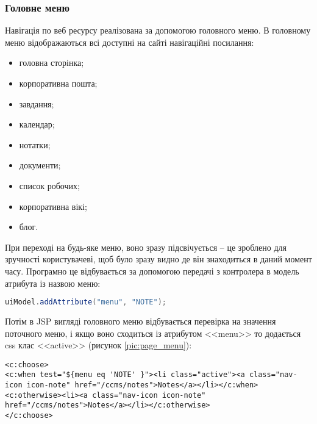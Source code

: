 \subsubsection{Головне меню}
\par Навігація по веб ресурсу реалізована за допомогою головного меню. В головному меню відображаються всі доступні на сайті навігаційні посилання:
\begin{itemize}
  \item головна сторінка;
  \item корпоративна пошта;
  \item завдання;
  \item календар;
  \item нотатки;
  \item документи;
  \item список робочих;
  \item корпоративна вікі;
  \item блог.
\end{itemize}
\par При переході на будь-яке меню, воно зразу підсвічується -- це зроблено для зручності користувачеві, щоб було зразу видно де він знаходиться в даний момент часу. Програмно це відбувається за допомогою передачі з контролера в модель атрибута із назвою меню:
\begin{lstlisting}[language=Java]
uiModel.addAttribute("menu", "NOTE");
\end{lstlisting}
\par Потім в JSP вигляді головного меню відбувається перевірка на значення поточного меню, і якщо воно сходиться із атрибутом <<menu>> то додається css клас <<active>> (рисунок \ref{pic:page_menu}):

\begin{lstlisting}
<c:choose>
<c:when test="${menu eq 'NOTE' }"><li class="active"><a class="nav-icon icon-note" href="/ccms/notes">Notes</a></li></c:when>
<c:otherwise><li><a class="nav-icon icon-note" href="/ccms/notes">Notes</a></li></c:otherwise>
</c:choose>
\end{lstlisting}

